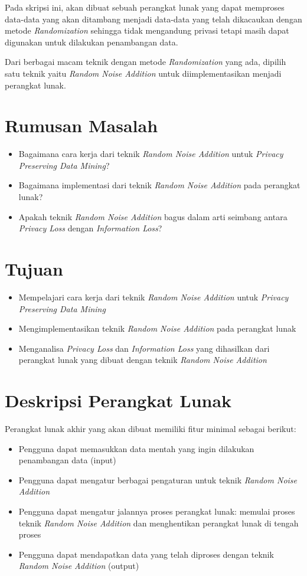 \documentclass[a4paper,twoside]{article}
\begin{document}
Pada skripsi ini, akan dibuat sebuah perangkat lunak yang dapat memproses data-data yang akan ditambang menjadi data-data yang telah dikacaukan dengan metode \textit{Randomization} sehingga tidak mengandung privasi tetapi masih dapat digunakan untuk dilakukan penambangan data.

Dari berbagai macam teknik dengan metode \textit{Randomization} yang ada, dipilih satu teknik yaitu \textit{Random Noise Addition} untuk diimplementasikan menjadi perangkat lunak.

\section{Rumusan Masalah}
\begin{itemize}
	\item Bagaimana cara kerja dari teknik \textit{Random Noise Addition} untuk \textit{Privacy Preserving Data Mining}?
	\item Bagaimana implementasi dari teknik \textit{Random Noise Addition} pada perangkat lunak?
	\item Apakah teknik \textit{Random Noise Addition} bagus dalam arti seimbang antara \textit{Privacy Loss} dengan \textit{Information Loss}?
\end{itemize}

\section{Tujuan}
\begin{itemize}
	\item Mempelajari cara kerja dari teknik \textit{Random Noise Addition} untuk \textit{Privacy Preserving Data Mining}
	\item Mengimplementasikan teknik \textit{Random Noise Addition} pada perangkat lunak
	\item Menganalisa \textit{Privacy Loss} dan \textit{Information Loss} yang dihasilkan dari perangkat lunak yang dibuat dengan teknik \textit{Random Noise Addition}
\end{itemize}

\section{Deskripsi Perangkat Lunak}
Perangkat lunak akhir yang akan dibuat memiliki fitur minimal sebagai berikut:
\begin{itemize}
	\item Pengguna dapat memasukkan data mentah yang ingin dilakukan penambangan data (input)
	\item Pengguna dapat mengatur berbagai pengaturan untuk teknik \textit{Random Noise Addition} 
	\item Pengguna dapat mengatur jalannya proses perangkat lunak: memulai proses teknik \textit{Random Noise Addition} dan menghentikan perangkat lunak di tengah proses
	\item Pengguna dapat mendapatkan data yang telah diproses dengan teknik \textit{Random Noise Addition} (output)
\end{itemize}
\end{document}
